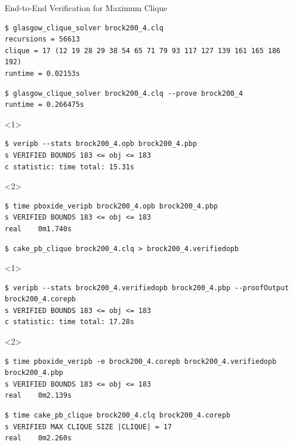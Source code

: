 \documentclass[aspectratio=169,compress,10pt]{beamer}
\begin{document}
\begin{frame}[fragile,t]{End-to-End Verification for Maximum Clique}\vspace*{-0.3cm}
\begin{Verbatim}[fontsize=\scriptsize]
$ glasgow_clique_solver brock200_4.clq
recursions = 56613
clique = 17 (12 19 28 29 38 54 65 71 79 93 117 127 139 161 165 186 192)
runtime = 0.02153s
\end{Verbatim}
\smallskip
\begin{Verbatim}[fontsize=\scriptsize]
$ glasgow_clique_solver brock200_4.clq --prove brock200_4
runtime = 0.266475s
\end{Verbatim}
\smallskip
\begin{onlyenv}<1>
\begin{Verbatim}[fontsize=\scriptsize]
$ veripb --stats brock200_4.opb brock200_4.pbp
s VERIFIED BOUNDS 183 <= obj <= 183
c statistic: time total: 15.31s
\end{Verbatim}
\end{onlyenv}\begin{onlyenv}<2>
\begin{Verbatim}[fontsize=\scriptsize]
$ time pboxide_veripb brock200_4.opb brock200_4.pbp
s VERIFIED BOUNDS 183 <= obj <= 183
real    0m1.740s
\end{Verbatim}
\end{onlyenv}
\smallskip
\begin{Verbatim}[fontsize=\scriptsize]
$ cake_pb_clique brock200_4.clq > brock200_4.verifiedopb
\end{Verbatim}
\smallskip
\begin{onlyenv}<1>
\begin{Verbatim}[fontsize=\scriptsize]
$ veripb --stats brock200_4.verifiedopb brock200_4.pbp --proofOutput brock200_4.corepb
s VERIFIED BOUNDS 183 <= obj <= 183
c statistic: time total: 17.28s
\end{Verbatim}
\end{onlyenv}\begin{onlyenv}<2>
\begin{Verbatim}[fontsize=\scriptsize]
$ time pboxide_veripb -e brock200_4.corepb brock200_4.verifiedopb brock200_4.pbp
s VERIFIED BOUNDS 183 <= obj <= 183
real    0m2.139s
\end{Verbatim}
\end{onlyenv}
\smallskip
\begin{Verbatim}[fontsize=\scriptsize]
$ time cake_pb_clique brock200_4.clq brock200_4.corepb
s VERIFIED MAX CLIQUE SIZE |CLIQUE| = 17
real    0m2.260s
\end{Verbatim}
\end{frame}
\end{document}
